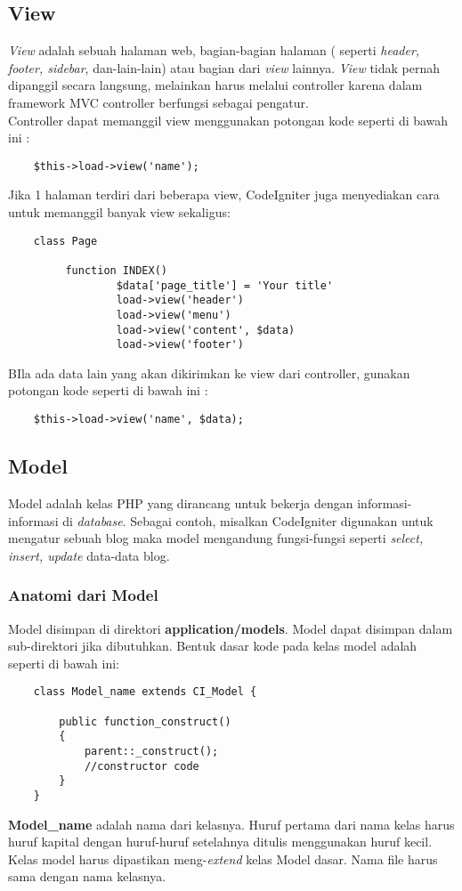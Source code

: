 \subsection{View}
\textit{View} adalah sebuah halaman web, bagian-bagian halaman ( seperti \textit{header, footer, sidebar}, dan-lain-lain) atau bagian dari \textit{view} lainnya. \textit{View} tidak pernah dipanggil secara langsung, melainkan harus melalui controller karena dalam framework MVC controller berfungsi sebagai pengatur.\cite{CodeIgniter:17} \\
Controller dapat memanggil view menggunakan potongan kode seperti di bawah ini :
\begin{lstlisting}
	$this->load->view('name');
\end{lstlisting}
Jika 1 halaman terdiri dari beberapa view, CodeIgniter juga menyediakan cara untuk memanggil banyak view sekaligus:
\begin{lstlisting}
	class Page

       	 function INDEX()
        	     $data['page_title'] = 'Your title'
        	     load->view('header')
        	     load->view('menu')
       	         load->view('content', $data)
       	         load->view('footer')

\end{lstlisting}
BIla ada data lain yang akan dikirimkan ke view dari controller, gunakan potongan kode seperti di bawah ini :
\begin{lstlisting}
	$this->load->view('name', $data);
\end{lstlisting}

\subsection{Model}
Model adalah kelas PHP yang dirancang untuk bekerja dengan informasi-informasi di \textit{database}. Sebagai contoh, misalkan CodeIgniter digunakan untuk mengatur sebuah blog maka model mengandung fungsi-fungsi seperti \textit{select, insert, update }data-data blog. \cite{CodeIgniter:17}

\subsubsection{Anatomi dari Model}
Model disimpan di direktori \textbf{application/models}. Model dapat disimpan dalam sub-direktori jika dibutuhkan. Bentuk dasar kode pada kelas model adalah seperti di bawah ini: \cite{CodeIgniter:17}
\begin{lstlisting}
	class Model_name extends CI_Model {
	
		public function_construct()
		{
			parent::_construct();
			//constructor code
		}
	}
\end{lstlisting}
\textbf{Model\_name} adalah nama dari kelasnya. Huruf pertama dari nama kelas harus huruf kapital dengan huruf-huruf setelahnya ditulis menggunakan huruf kecil. Kelas model harus dipastikan meng-\textit{extend} kelas Model dasar. Nama file harus sama dengan nama kelasnya. \cite{CodeIgniter:17}

